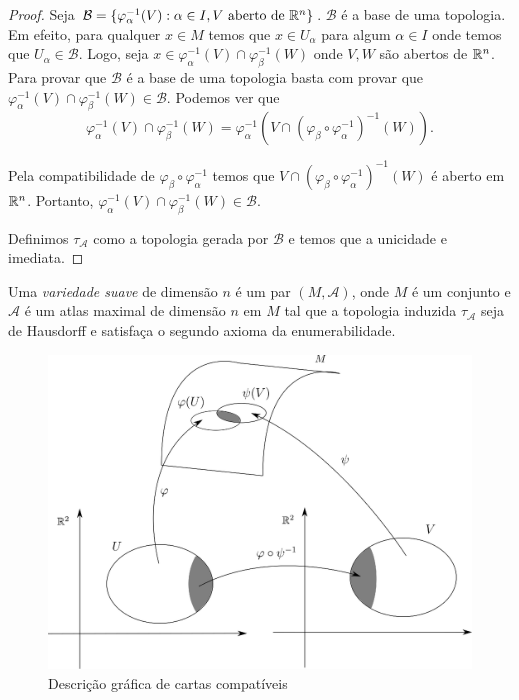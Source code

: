 \begin{proof}
	Seja $\mathcal{B} = \{ \varphi_{\alpha}^{-1}(V): \alpha \in I, V \text{ aberto de } \mathbb{R}^n \}$. $\mathcal{B}$ é a base de uma topologia. Em efeito, para qualquer $x \in M$ temos que $x \in U_{\alpha}$ para algum $\alpha \in I$ onde temos que $U_{\alpha} \in \mathcal{B}$. Logo, seja $x \in \varphi_{\alpha}^{-1}(V) \cap \varphi_{\beta}^{-1}(W)$ onde $V, W$ são abertos de $\mathbb{R}^n$. Para provar que $\mathcal{B}$ é a base de uma topologia basta com provar que $\varphi_{\alpha}^{-1}(V) \cap \varphi_{\beta}^{-1}(W) \in \mathcal{B}$. Podemos ver que
	\begin{equation*}
		\varphi_{\alpha}^{-1}(V) \cap \varphi_{\beta}^{-1}(W) = \varphi_{\alpha}^{-1} \left( V \cap (\varphi_{\beta} \circ \varphi_{\alpha}^{-1})^{-1}(W) \right).
	\end{equation*}
	
	Pela compatibilidade de $\varphi_{\beta} \circ \varphi_{\alpha}^{-1}$ temos que $V \cap (\varphi_{\beta} \circ \varphi_{\alpha}^{-1})^{-1}(W)$ é aberto em $\mathbb{R}^n$. Portanto, $\varphi_{\alpha}^{-1}(V) \cap \varphi_{\beta}^{-1}(W) \in \mathcal{B}$.
	
	Definimos $\tau_{\mathcal{A}}$ como a topologia gerada por $\mathcal{B}$ e temos que a unicidade e imediata.
\end{proof}

\begin{defi}
	Uma \emph{variedade suave} de dimensão $n$ é um par $(M, \mathcal{A})$, onde $M$ é um conjunto e $\mathcal{A}$ é um atlas maximal de dimensão $n$ em $M$ tal que a topologia induzida $\tau_{\mathcal{A}}$ seja de Hausdorff e satisfaça o segundo axioma da enumerabilidade.
\end{defi}

\begin{figure}
	\centering
	\includegraphics[scale=0.5]{graficos/cartas_compativeis.eps}
	\caption{Descrição gráfica de cartas compatíveis}
\end{figure}


